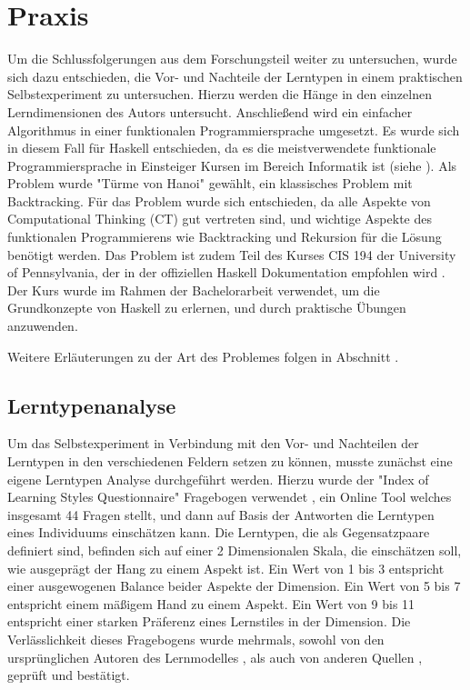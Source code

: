 \clearpage
\section{Praxis}
\label{sec:practice}

Um die Schlussfolgerungen aus dem Forschungsteil weiter zu untersuchen, wurde sich dazu entschieden, die Vor- und Nachteile der Lerntypen in einem praktischen Selbstexperiment zu untersuchen.
Hierzu werden die Hänge in den einzelnen Lerndimensionen des Autors untersucht. Anschließend wird ein einfacher Algorithmus in einer funktionalen Programmiersprache umgesetzt. Es wurde sich in diesem Fall für Haskell entschieden, da es die meistverwendete funktionale Programmiersprache in Einsteiger Kursen im Bereich Informatik ist (siehe ).
Als Problem wurde "Türme von Hanoi" gewählt, ein klassisches Problem mit Backtracking.
Für das Problem wurde sich entschieden, da alle Aspekte von Computational Thinking (CT) gut vertreten sind, und wichtige Aspekte des funktionalen Programmierens wie Backtracking und Rekursion für die Lösung benötigt werden.
Das Problem ist zudem Teil des Kurses CIS 194 \cite{cis194} der University of Pennsylvania, der in der offiziellen Haskell Dokumentation empfohlen wird \cite{haskelldoc}. Der Kurs wurde im Rahmen der Bachelorarbeit verwendet, um die Grundkonzepte von Haskell zu erlernen, und durch praktische Übungen anzuwenden.

Weitere Erläuterungen zu der Art des Problemes folgen in Abschnitt .

\subsection{Lerntypenanalyse}
Um das Selbstexperiment in Verbindung mit den Vor- und Nachteilen der Lerntypen in den verschiedenen Feldern setzen zu können, musste zunächst eine eigene Lerntypen Analyse durchgeführt werden.
Hierzu wurde der "Index of Learning Styles Questionnaire" Fragebogen verwendet \cite{ils_questionnaire}, ein Online Tool welches insgesamt 44 Fragen stellt, und dann auf Basis der Antworten die Lerntypen eines Individuums einschätzen kann. Die Lerntypen, die als Gegensatzpaare definiert sind, befinden sich auf einer 2 Dimensionalen Skala, die einschätzen soll, wie ausgeprägt der Hang zu einem Aspekt ist. Ein Wert von 1 bis 3 entspricht einer ausgewogenen Balance beider Aspekte der Dimension. Ein Wert von 5 bis 7 entspricht einem mäßigem Hand zu einem Aspekt. Ein Wert von 9 bis 11 entspricht einer starken Präferenz eines Lernstiles in der Dimension.
Die Verlässlichkeit dieses Fragebogens wurde mehrmals, sowohl von den ursprünglichen Autoren des Lernmodelles \cite{felder2005}, als auch von anderen Quellen \cite{zywno}, geprüft und bestätigt.

